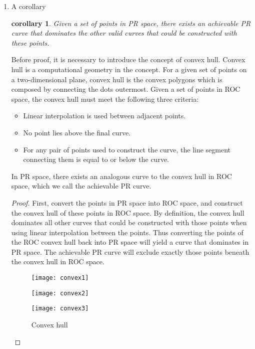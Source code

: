 \documentclass[a4paper,12pt]{article}
\begin{document}
\begin{enumerate}
\item A corollary
\newtheorem{corollary}{corollary} %
\begin{corollary}
Given a set of points in PR space, there exists an achievable PR curve that dominates the other valid curves that could be constructed with these points.
\end{corollary}
Before proof, it is necessary to introduce the concept of convex hull. Convex hull is a computational geometry in the concept. For a given set of points on a two-dimensional plane, convex hull is the convex polygons which is composed by connecting the dots outermost.  Given a set of points in ROC space, the convex hull must meet the following three criteria:
\begin{itemize}
\item Linear interpolation is used between adjacent points.
\item No point lies above the final curve.
\item For any pair of points used to construct the curve, the line segment connecting them is equal to or below the curve.
\end{itemize}

In PR space, there exists an analogous curve to the convex hull in ROC space, which we call the achievable PR curve.

\begin{proof} First, convert the points in PR space into ROC space, and construct the convex hull of these points in ROC space. By definition, the convex hull dominates all other curves that could be constructed with those points when using linear interpolation between the points. Thus converting the points of the ROC convex hull back into PR space will yield a curve that dominates in PR space. The achievable PR curve will exclude exactly those points beneath the convex hull in ROC space.

\begin{figure}[!ht]
\begin{minipage}[t]{0.5\textwidth}
\centering\texttt{[image: convex1]}
\end{minipage}
\begin{minipage}[t]{0.5\textwidth}
\centering\texttt{[image: convex2]}
\end{minipage}
\end{figure}
\begin{figure}[!ht]
\centering
\texttt{[image: convex3]}
\caption{Convex hull}\label{convex_hull}
\end{figure} 


\end{proof}
\end{enumerate}
\end{document}
